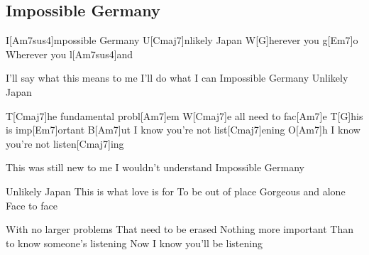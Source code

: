 \subsection*{Impossible Germany   }
\begin{guitar}
I[Am7sus4]mpossible Germany 
U[Cmaj7]nlikely Japan
W[G]herever you g[Em7]o
Wherever you l[Am7sus4]and\qquad\qquad\qquad[Am7]{}

I’ll say what this means to me
I’ll do what I can
Impossible Germany
Unlikely Japan



T[Cmaj7]he fundamental probl[Am7]em
W[Cmaj7]e all need to fac[Am7]e
T[G]his is imp[Em7]ortant
B[Am7]ut I know you’re not list[Cmaj7]ening
O[Am7]h I know you’re not listen[Cmaj7]ing



This was still new to me
I wouldn’t understand
Impossible Germany 

Unlikely Japan
This is what love is for
To be out of place
Gorgeous and alone
Face to face



With no larger problems
That need to be erased
Nothing more important 
Than to know someone’s listening
Now I know you’ll be listening
\end{guitar}
